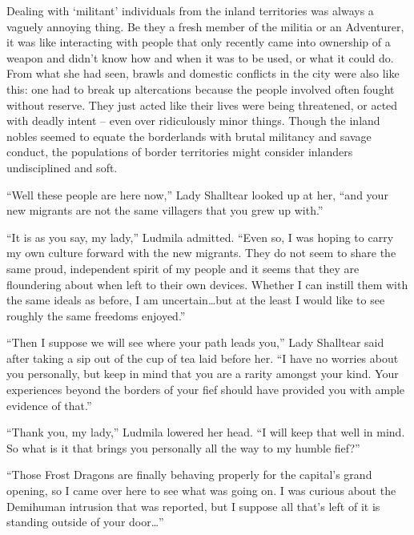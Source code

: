  

Dealing with ‘militant’ individuals from the inland territories was always a vaguely annoying thing. Be they a fresh member of the militia or an Adventurer, it was like interacting with people that only recently came into ownership of a weapon and didn’t know how and when it was to be used, or what it could do. From what she had seen, brawls and domestic conflicts in the city were also like this: one had to break up altercations because the people involved often fought without reserve. They just acted like their lives were being threatened, or acted with deadly intent – even over ridiculously minor things. Though the inland nobles seemed to equate the borderlands with brutal militancy and savage conduct, the populations of border territories might consider inlanders undisciplined and soft.

 

“Well these people are here now,” Lady Shalltear looked up at her, “and your new migrants are not the same villagers that you grew up with.”

 

“It is as you say, my lady,” Ludmila admitted. “Even so, I was hoping to carry my own culture forward with the new migrants. They do not seem to share the same proud, independent spirit of my people and it seems that they are floundering about when left to their own devices. Whether I can instill them with the same ideals as before, I am uncertain…but at the least I would like to see roughly the same freedoms enjoyed.”

 

“Then I suppose we will see where your path leads you,” Lady Shalltear said after taking a sip out of the cup of tea laid before her. “I have no worries about you personally, but keep in mind that you are a rarity amongst your kind. Your experiences beyond the borders of your fief should have provided you with ample evidence of that.”

 

“Thank you, my lady,” Ludmila lowered her head. “I will keep that well in mind. So what is it that brings you personally all the way to my humble fief?”

 

“Those Frost Dragons are finally behaving properly for the capital’s grand opening, so I came over here to see what was going on. I was curious about the Demihuman intrusion that was reported, but I suppose all that’s left of it is standing outside of your door…”

